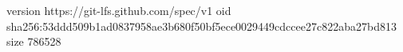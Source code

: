 version https://git-lfs.github.com/spec/v1
oid sha256:53ddd509b1ad0837958ae3b680f50bf5ece0029449cdccee27c822aba27bd813
size 786528
